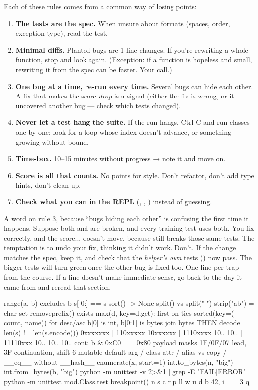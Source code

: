 \documentclass[10pt,a4paper]{article}
\begin{document}
Each of these rules comes from a common way of losing points:
\begin{enumerate}
\item \textbf{The tests are the spec.} When unsure about formats (spaces, order, exception type), read the test.
\item \textbf{Minimal diffs.} Planted bugs are 1-line changes. If you’re rewriting a whole function, stop and look again. (Exception: if a function is hopeless and small, rewriting it from the spec can be faster. Your call.)
\item \textbf{One bug at a time, re-run every time.} Several bugs can hide each other. A fix that makes the score \emph{drop} is a signal (either the fix is wrong, or it uncovered another bug — check which tests changed).
\item \textbf{Never let a test hang the suite.} If the run hangs, Ctrl-C and run classes one by one; look for a  loop whose index doesn’t advance, or something growing without bound.
\item \textbf{Time-box.} 10–15 minutes without progress → note it and move on.
\item \textbf{Score is all that counts.} No points for style. Don’t refactor, don’t add type hints, don’t clean up.
\item \textbf{Check what you can in the REPL} (, , ) instead of guessing.
\end{enumerate}
A word on rule 3, because “bugs hiding each other” is confusing the first time it happens. Suppose both  and  are broken, and every training test uses both. You fix  correctly, and the score... doesn’t move, because  still breaks those same tests. The temptation is to undo your fix, thinking it didn’t work. Don’t. If the change matches the spec, keep it, and check that the \emph{helper’s own} tests () now pass. The bigger tests will turn green once the other bug is fixed too.
One line per trap from the course. If a line doesn’t make immediate sense, go back to the day it came from and reread that section.
\begin{txtcode}
range(a, b) excludes b          s[-0:] == s                 sort() -> None
split() vs split(" ")           strip("ab") = char set     removeprefix() exists
max(d, key=d.get): first on ties    sorted(key=(-count, name)) for desc/asc
b[0] is int, b[0:1] is bytes    join bytes THEN decode      len(s) != len(s.encode())
0xxxxxxx | 110xxxxx 10xxxxxx | 1110xxxx 10.. 10.. | 11110xxx 10.. 10.. 10..
cont: b & 0xC0 == 0x80   payload masks 1F/0F/07 lead, 3F continuation, shift 6
mutable default arg / class attr / alias vs copy / __eq__ without __hash__
enumerate(x, start=1)    int.to_bytes(n, "big")    int.from_bytes(b, "big")
python -m unittest -v 2>&1 | grep -E "FAIL|ERROR"     python -m unittest mod.Class.test
breakpoint()   n s c r p ll w u d   b 42, i == 3   q
\end{txtcode}
\end{document}
